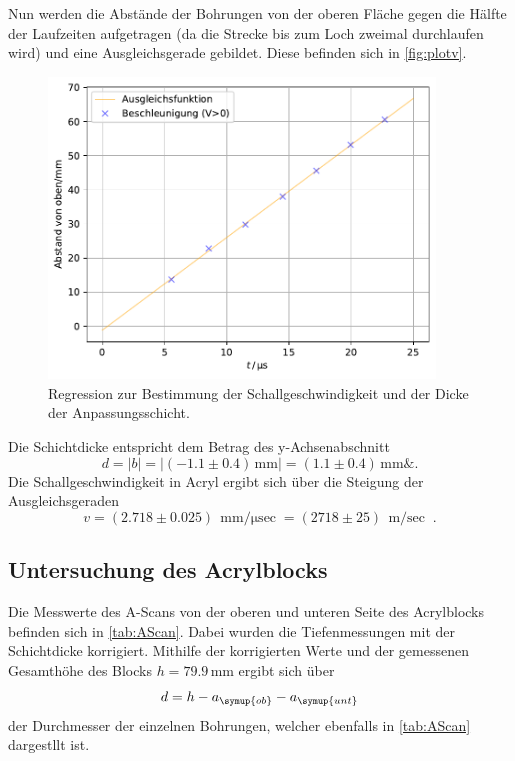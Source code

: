 Nun werden die Abstände der Bohrungen von der oberen Fläche gegen die Hälfte der Laufzeiten aufgetragen (da die Strecke bis zum Loch zweimal 
durchlaufen wird) und eine Ausgleichsgerade gebildet. Diese befinden sich in \autoref{fig:plotv}.
\begin{figure}
    \centering
    \includegraphics[height = 8cm]{build/plotv.pdf}
    \caption{Regression zur Bestimmung der Schallgeschwindigkeit und der Dicke der Anpassungsschicht.}
    \label{fig:plotv}
\end{figure}

Die Schichtdicke entspricht dem Betrag des y-Achsenabschnitt
\begin{equation*}
    d = \lvert b\rvert = \lvert (-1.1 \pm 0.4) \, \unit{\mm}\rvert =  (1.1 \pm 0.4) \, \unit{\mm} \& .
\end{equation*}
Die Schallgeschwindigkeit in Acryl ergibt sich über die Steigung der Ausgleichsgeraden
\begin{equation*}
    v = (2.718 \pm 0.025) \, \unit{\mm \per \micro\sec} = (2718\pm 25) \, \unit{\m\per\sec} \; .
\end{equation*}

\subsection{Untersuchung des Acrylblocks}
Die Messwerte des A-Scans von der oberen und unteren Seite des Acrylblocks befinden sich in \autoref{tab:AScan}. Dabei wurden die Tiefenmessungen 
mit der Schichtdicke korrigiert. Mithilfe der korrigierten Werte und der gemessenen Gesamthöhe des Blocks $h = 79.9\,\unit{\mm}$ ergibt sich über 
\begin{equation*}
    d = h - a_{\symup{ob}} - a_{\symup{unt}}
\end{equation*}
der Durchmesser der einzelnen Bohrungen, welcher ebenfalls in \autoref{tab:AScan} dargestllt ist.


